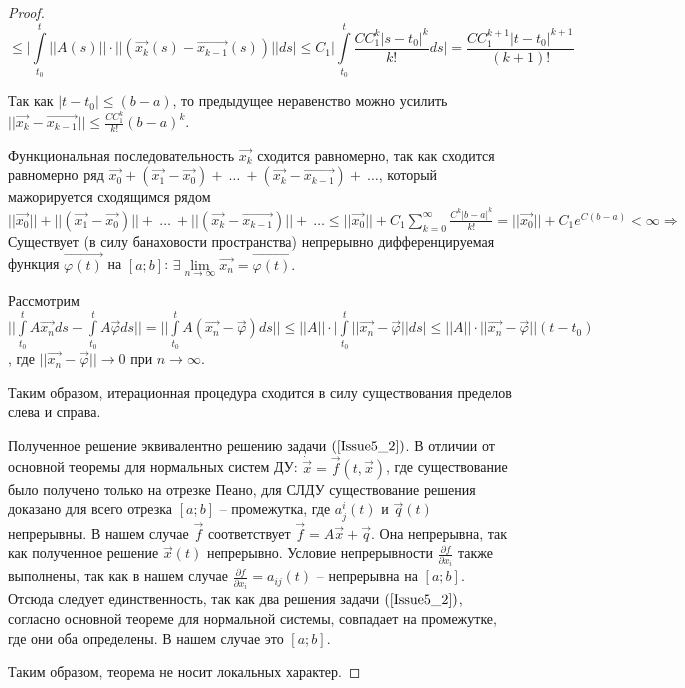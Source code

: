 \begin{proof}
\[ \leqslant \Big| \int\limits_{t_0}^{t} ||A(s)||\cdot ||(\overrightarrow{x_k}(s) - \overrightarrow{x_{k-1}}(s))|| ds \Big| \leqslant C_1 \Big| \int\limits_{t_0}^{t} \frac{CC_1^k|s-t_0|^k}{k!}ds \Big| = \frac{CC_1^{k+1}|t-t_0|^{k+1}}{(k+1)!} \]

Так как $|t-t_0| \leqslant (b-a)$, то предыдущее неравенство можно усилить $||\overrightarrow{x_k} - \overrightarrow{x_{k-1}}|| \leqslant \frac{CC_1^k}{k!}(b-a)^k.$

Функциональная последовательность $\overrightarrow{x_k}$ сходится равномерно, так как сходится равномерно ряд $\overrightarrow{x_0} + (\overrightarrow{x_1} - \overrightarrow{x_0}) +\ \dots\ +(\overrightarrow{x_k} - \overrightarrow{x_{k-1}}) +\ \dots$, который мажорируется сходящимся рядом $||\overrightarrow{x_0}|| + ||(\overrightarrow{x_1} - \overrightarrow{x_0})|| +\ \dots\ + ||(\overrightarrow{x_k} - \overrightarrow{x_{k-1}})|| +\ \dots \leqslant ||\overrightarrow{x_0}|| + C_1\sum\limits_{k = 0}^{\infty}\frac{C^k|b-a|^k}{k!} = ||\overrightarrow{x_0}|| + C_1 e^{C(b-a)} < \infty \Rightarrow$ Существует (в силу банаховости пространства) непрерывно дифференцируемая функция $\overrightarrow{\varphi(t)}$ на $[a;b]$: $\exists \lim\limits_{n \rightarrow \infty} \overrightarrow{x_n} = \overrightarrow{\varphi(t)}.$

Рассмотрим $\Big| \Big| \int\limits_{t_0}^{t} A\overrightarrow{x_n}ds - \int\limits_{t_0}^{t} A\overrightarrow{\varphi} ds \Big| \Big| = \Big| \Big| \int\limits_{t_0}^{t} A(\overrightarrow{x_n} - \overrightarrow{\varphi})ds \Big| \Big| \leqslant ||A||\cdot \Big| \int\limits_{t_0}^{t} ||\overrightarrow{x_n} - \overrightarrow{\varphi}|| ds \Big| \leqslant ||A|| \cdot ||\overrightarrow{x_n} - \overrightarrow{\varphi}|| (t - t_0)$, где $||\overrightarrow{x_n} - \overrightarrow{\varphi} || \rightarrow 0$ при $n \rightarrow \infty$.

Таким образом, итерационная процедура сходится в силу существования пределов слева и справа.

Полученное решение эквивалентно решению задачи $(\ref{Issue5_2})$. В отличии от основной теоремы для нормальных систем ДУ: $\dot{\overrightarrow{x}} = \overrightarrow{f}(t, \overrightarrow{x})$, где существование было получено только на отрезке Пеано, для СЛДУ существование решения доказано для всего отрезка $[a;b]$ -- промежутка, где $a_j^i(t)$ и $\overrightarrow{q}(t)$ непрерывны. В нашем случае $\overrightarrow{f}$ соответствует $\overrightarrow{f} = A\overrightarrow{x} + \overrightarrow{q}$. Она непрерывна, так как полученное решение $\overrightarrow{x}(t)$ непрерывно. Условие непрерывности $\frac{\partial f}{\partial x_i}$ также выполнены, так как в нашем случае $\frac{\partial f}{\partial x_i} = a_{ij}(t)$ -- непрерывна на $[a;b]$. Отсюда следует единственность, так как два решения задачи $(\ref{Issue5_2})$, согласно основной теореме для нормальной системы, совпадает на промежутке, где они оба определены. В нашем случае это $[a;b]$.

Таким образом, теорема не носит локальных характер.

\end{proof}
